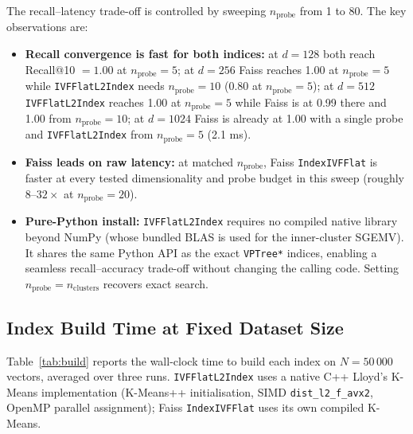 \documentclass[11pt,a4paper]{article}
\begin{document}
The recall--latency trade-off is controlled by sweeping
$n_{\mathrm{probe}}$ from 1 to 80.  The key observations are:

\begin{itemize}
  \item \textbf{Recall convergence is fast for both indices:}
        at $d=128$ both reach Recall@10 $=1.00$ at
        $n_{\mathrm{probe}} = 5$; at $d=256$ Faiss reaches 1.00 at
        $n_{\mathrm{probe}} = 5$ while \texttt{IVFFlatL2Index} needs
        $n_{\mathrm{probe}} = 10$ (0.80 at $n_{\mathrm{probe}}=5$); at
        $d=512$ \texttt{IVFFlatL2Index} reaches 1.00 at
        $n_{\mathrm{probe}} = 5$ while Faiss is at 0.99 there and 1.00
        from $n_{\mathrm{probe}} = 10$; at $d=1024$ Faiss is already at
        1.00 with a single probe and \texttt{IVFFlatL2Index} from
        $n_{\mathrm{probe}} = 5$ (2.1 ms).
  \item \textbf{Faiss leads on raw latency:} at matched
        $n_{\mathrm{probe}}$, Faiss \texttt{IndexIVFFlat} is faster at
        every tested dimensionality and probe budget in this sweep
        (roughly $8\text{--}32\times$ at $n_{\mathrm{probe}} = 20$).
  \item \textbf{Pure-Python install:} \texttt{IVFFlatL2Index}
        requires no compiled native library beyond NumPy (whose bundled
        BLAS is used for the inner-cluster SGEMV).  It shares the same
        Python API as the exact \texttt{VPTree*} indices, enabling a
        seamless recall--accuracy trade-off without changing the calling
        code.  Setting $n_{\mathrm{probe}} = n_{\mathrm{clusters}}$
        recovers exact search.
\end{itemize}

\subsection{Index Build Time at Fixed Dataset Size}
\label{sec:approx-build}

Table~\ref{tab:build} reports the wall-clock time to build each index on
$N = 50\,000$ vectors, averaged over three runs.
\texttt{IVFFlatL2Index} uses a native C++ Lloyd's K-Means implementation
(K-Means++ initialisation, SIMD \texttt{dist\_l2\_f\_avx2}, OpenMP parallel
assignment); Faiss \texttt{IndexIVFFlat} uses its
own compiled K-Means.
\end{document}
